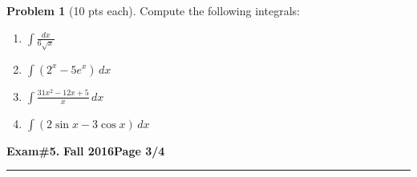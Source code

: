 \documentclass[12pt]{article}
\theoremstyle{definition}
\newtheorem{problem}{Problem}
\begin{document}
\begin{problem}[10 pts each] 
Compute the following integrals:
\begin{enumerate}
\item $\displaystyle{\int \frac{dx}{6\sqrt{x}}}$
\vspace{1cm}
\begin{flushright}
\end{flushright}
\item $\displaystyle{\int (2^x-5e^x)\, dx}$
\vspace{2.5cm}
\begin{flushright}
\end{flushright}
\item $\displaystyle{\int \frac{31 x^2 - 12x + 5}{ x }\, dx}$
\vspace{3cm}
\begin{flushright}
\end{flushright}
\item $\displaystyle{\int (2\sin x - 3\cos x)\, dx}$
\vspace{3cm}
\begin{flushright}
\end{flushright}
\end{enumerate}
\end{problem}
\newpage

\hfill{\large\bf Exam\#5.}\hfill{\large\bf
Fall 2016}\hfill{\large\bf Page 3/4}\hrule

\bigskip
\end{document}
